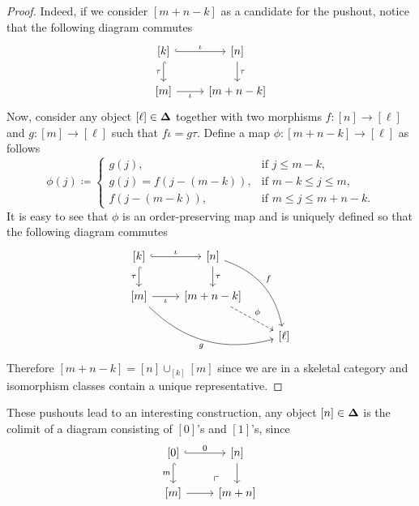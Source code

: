 \begin{proof}
    Indeed, if we consider \([m + n - k]\) as a candidate for the pushout, notice
    that the following diagram commutes
    \[
        \begin{tikzcd}
            {[k]} \ar[r, hook, "\iota"] \ar[d, hook, "\tau"']
            &{[n]} \ar[d, "\tau"] \\
            {[m]} \ar[r, "\iota"'] &{[m + n - k]}
        \end{tikzcd}
    \]
    Now, consider any object \([\ell] \in {\mathbf{\Delta}}\) together with two morphisms
    \(f: [n] \to [\ell]\) and \(g: [m] \to [\ell]\) such that \(f \iota = g
    \tau\). Define a map \(\phi: [m + n - k] \to [\ell]\) as follows
    \[
        \phi(j) \coloneq
        \begin{cases}
            g(j),                  & \text{if } j \leq m - k,            \\
            g(j) = f(j - (m - k)), & \text{if } m - k \leq j \leq m,     \\
            f(j - (m - k)),        & \text{if } m \leq j \leq m + n - k.
        \end{cases}
    \]
    It is easy to see that \(\phi\) is an order-preserving map and is uniquely
    defined so that the following diagram commutes
    \[
        \begin{tikzcd}
            {[k]} \ar[r, hook, "\iota"] \ar[d, hook, "\tau"']
            &{[n]} \ar[d, "\tau"] \ar[drd, bend left, "f"] & \\
            {[m]} \ar[r, "\iota"'] \ar[rrd, bend right, "g"']
            &{[m + n - k]} \ar[rd, dashed, "\phi"] & \\
            & &{[\ell]}
        \end{tikzcd}
    \]
    Therefore \([m + n - k] = [n] \cup_{[k]} [m]\) since we are in a skeletal
    category and isomorphism classes contain a unique representative.
\end{proof}

These pushouts lead to an interesting construction, any object \([n] \in {\mathbf{\Delta}}\)
is the colimit of a diagram consisting of \([0]\)'s and \([1]\)'s, since
\[
    \begin{tikzcd}
        {[0]} \ar[r, hook, "0"]
        \ar[d, hook, "m"'] \ar[rd, phantom, very near end, "\ulcorner"]
        &{[n]} \ar[d] \\
        {[m]} \ar[r] &{[m + n]}
    \end{tikzcd}
\]

